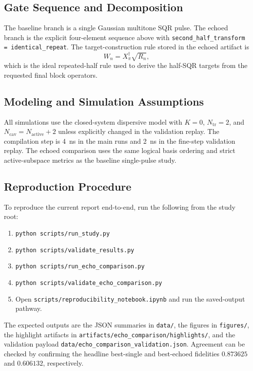 \documentclass[aps,pra,twocolumn,reprint,floatfix,amsmath,amssymb]{revtex4-2}
\begin{document}
\subsection{Gate Sequence and Decomposition}
The baseline branch is a single Gaussian multitone SQR pulse. The echoed branch is the explicit four-element sequence above with \texttt{second\_half\_transform = identical\_repeat}. The target-construction rule stored in the echoed artifact is
\[
W_n = X_\pi^\dagger \sqrt{R_n},
\]
which is the ideal repeated-half rule used to derive the half-SQR targets from the requested final block operators.

\subsection{Modeling and Simulation Assumptions}
All simulations use the closed-system dispersive model with \(K=0\), \(N_{\mathrm{tr}}=2\), and \(N_{\mathrm{cav}}=N_{\mathrm{active}}+2\) unless explicitly changed in the validation replay. The compilation step is \SI{4}{ns} in the main runs and \SI{2}{ns} in the fine-step validation replay. The echoed comparison uses the same logical basis ordering and strict active-subspace metrics as the baseline single-pulse study.

\subsection{Reproduction Procedure}
To reproduce the current report end-to-end, run the following from the study root:
\begin{enumerate}
  \item \texttt{python scripts/run\_study.py}
  \item \texttt{python scripts/validate\_results.py}
  \item \texttt{python scripts/run\_echo\_comparison.py}
  \item \texttt{python scripts/validate\_echo\_comparison.py}
  \item Open \texttt{scripts/reproducibility\_notebook.ipynb} and run the saved-output pathway.
\end{enumerate}
The expected outputs are the JSON summaries in \texttt{data/}, the figures in \texttt{figures/}, the highlight artifacts in \texttt{artifacts/echo\_comparison/highlights/}, and the validation payload \texttt{data/echo\_comparison\_validation.json}. Agreement can be checked by confirming the headline best-single and best-echoed fidelities \(0.873625\) and \(0.606132\), respectively.
\end{document}
